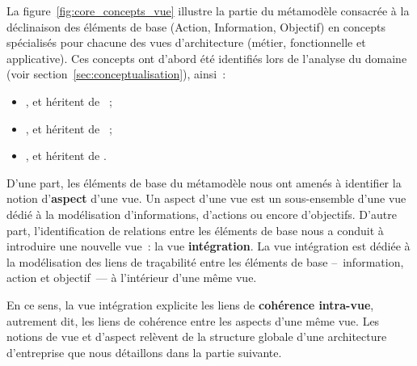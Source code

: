     La figure~\ref{fig:core_concepts_vue} illustre la partie du métamodèle consacrée 
    à la déclinaison des éléments de base (Action, Information, Objectif) en concepts spécialisés
    pour chacune des vues d'architecture (métier, fonctionnelle et applicative).
    Ces concepts ont d'abord été identifiés lors de l'analyse du domaine (voir section~\ref{sec:conceptualisation}), ainsi~:
    \begin{itemize}
    \item {},  et  héritent de ~;
    \item {},  et  héritent de ~;
    \item {},  et  héritent de .
    \end{itemize}

    D'une part, les éléments de base du métamodèle nous ont amenés à identifier la notion
    d'\textbf{aspect} d'une vue. Un aspect d'une vue est un sous-ensemble d'une vue dédié à la modélisation d'informations, d'actions
    ou encore d'objectifs.
    D'autre part, l'identification de relations entre les éléments de base nous a conduit à introduire une nouvelle vue~:
    la vue \textbf{intégration}. La vue intégration est dédiée à la modélisation des liens de traçabilité entre les éléments de base
    –~information, action et objectif~— à l'intérieur d'une même vue. 

    En ce sens, la vue intégration explicite les liens de \textbf{cohérence intra-vue},
    autrement dit, les liens de cohérence entre les aspects d'une même vue.
    Les notions de vue et d'aspect relèvent de la structure globale d'une architecture d'entreprise que
    nous détaillons dans la partie suivante.

